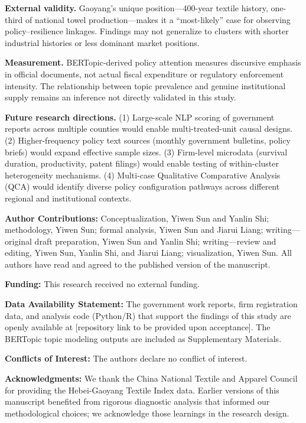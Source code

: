 \documentclass[sustainability,article,submit,moreauthors,pdftex]{mdpi}
\begin{document}
\textbf{External validity.} Gaoyang's unique position---400-year textile history, one-third of national towel production---makes it a ``most-likely'' case for observing policy--resilience linkages. Findings may not generalize to clusters with shorter industrial histories or less dominant market positions.

\textbf{Measurement.} BERTopic-derived policy attention measures discursive emphasis in official documents, not actual fiscal expenditure or regulatory enforcement intensity. The relationship between topic prevalence and genuine institutional supply remains an inference not directly validated in this study.

\textbf{Future research directions.} (1) Large-scale NLP scoring of government reports across multiple counties would enable multi-treated-unit causal designs. (2) Higher-frequency policy text sources (monthly government bulletins, policy briefs) would expand effective sample sizes. (3) Firm-level microdata (survival duration, productivity, patent filings) would enable testing of within-cluster heterogeneity mechanisms. (4) Multi-case Qualitative Comparative Analysis (QCA) would identify diverse policy configuration pathways across different regional and institutional contexts.

\vspace{1cm}
\noindent\textbf{Author Contributions:} Conceptualization, Yiwen Sun and Yanlin Shi; methodology, Yiwen Sun; formal analysis, Yiwen Sun and Jiarui Liang; writing---original draft preparation, Yiwen Sun and Yanlin Shi; writing---review and editing, Yiwen Sun, Yanlin Shi, and Jiarui Liang; visualization, Yiwen Sun. All authors have read and agreed to the published version of the manuscript.

\noindent\textbf{Funding:} This research received no external funding.

\noindent\textbf{Data Availability Statement:} The government work reports, firm registration data, and analysis code (Python/R) that support the findings of this study are openly available at [repository link to be provided upon acceptance]. The BERTopic topic modeling outputs are included as Supplementary Materials.

\noindent\textbf{Conflicts of Interest:} The authors declare no conflict of interest.

\noindent\textbf{Acknowledgments:} We thank the China National Textile and Apparel Council for providing the Hebei-Gaoyang Textile Index data. Earlier versions of this manuscript benefited from rigorous diagnostic analysis that informed our methodological choices; we acknowledge those learnings in the research design.


\end{document}
